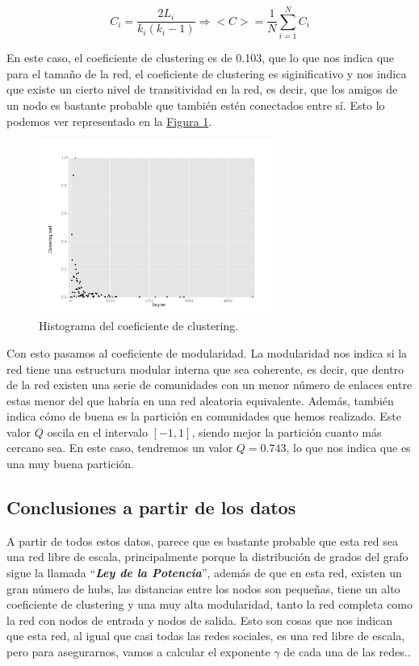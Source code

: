\documentclass[paper=a4, fontsize=11pt]{article} %
\numberwithin{equation}{section} %
\numberwithin{figure}{section} %
\numberwithin{table}{section} %
\begin{document}
\begin{displaymath}
    C_i = \frac{2L_i}{k_i(k_i - 1)} \Longrightarrow <C> = \frac{1}{N}\sum_{i=1}^NC_i
\end{displaymath}

En este caso, el coeficiente de clustering es de 0.103, que lo que nos indica que para el tamaño de la red, el coeficiente de clustering es siginificativo y nos indica que existe un cierto nivel de transitividad en la red, es decir, que los amigos de un nodo es bastante probable que también estén conectados entre sí. Esto lo podemos ver representado en la \hyperref[im3]{Figura \ref*{im3}}.

\begin{figure}[H]
  \centering
  \includegraphics[width=0.7\textwidth]{img/clust_hist}
  \caption{Histograma del coeficiente de clustering.}
  \label{im3}
\end{figure}

Con esto pasamos al coeficiente de modularidad. La modularidad nos indica si la red tiene una estructura modular interna que sea coherente, es decir, que dentro de la red existen una serie de comunidades con un menor número de enlaces entre estas menor del que habría en una red aleatoria equivalente. Además, también indica cómo de buena es la partición en comunidades que hemos realizado. Este valor $Q$ oscila en el intervalo $[-1,1]$, siendo mejor la partición cuanto más cercano sea. En este caso, tendremos un valor $Q = 0.743$, lo que nos indica que es una muy buena partición.

\subsection{Conclusiones a partir de los datos}

A partir de todos estos datos, parece que es bastante probable que esta red sea una red libre de escala, principalmente porque la distribución de grados del grafo sigue la llamada ``\textbf{\textit{Ley de la Potencia}}'', además de que en esta red, existen un gran número de hubs, las distancias entre los nodos son pequeñas, tiene un alto coeficiente de clustering y una muy alta modularidad, tanto la red completa como la red con nodos de entrada y nodos de salida. Esto son cosas que nos indican que esta red, al igual que casi todas las redes sociales, es una red libre de escala, pero para asegurarnos, vamos a calcular el exponente $\gamma$ de cada una de las redes.\cite{scalefree}.
\end{document}
